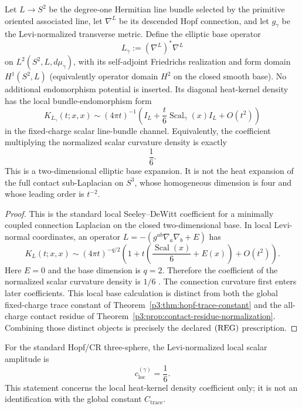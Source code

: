\documentclass[12pt,a4paper]{article}
\begin{document}
\begin{lemma}
\label{p3:lem:local-sixth-heat}
Let \(L\to S^2\) be the degree-one Hermitian line bundle selected by the
primitive oriented associated line, let \(\nabla^L\) be its descended Hopf connection,
and let \(g_\gamma\) be the Levi-normalized transverse metric.  Define the
elliptic base operator
\[
 L_\gamma:=(\nabla^L)^*\nabla^L
\]
on \(L^2(S^2,L,d\mu_\gamma)\), with its self-adjoint Friedrichs realization
and form domain \(H^1(S^2,L)\) (equivalently operator domain \(H^2\) on the
closed smooth base).  No additional endomorphism potential is inserted.  Its
diagonal heat-kernel density has the local bundle-endomorphism form
\begin{equation}
K_{L_\gamma}(t;x,x)
\sim
(4\pi t)^{-1}
\left(I_L+\frac{t}{6}\operatorname{Scal}_\gamma(x)I_L+O(t^2)\right)
\end{equation}
in the fixed-charge scalar line-bundle channel.  Equivalently, the coefficient multiplying the normalized scalar curvature density is exactly
\begin{equation}
\label{p3:eq:local-sixth-lemma}
\frac16 .
\end{equation}
This is a two-dimensional elliptic base expansion.  It is not the heat
expansion of the full contact sub-Laplacian on \(S^3\), whose homogeneous
dimension is four and whose leading order is \(t^{-2}\).
\end{lemma}
\begin{proof}
This is the standard local Seeley--DeWitt coefficient for a minimally coupled
connection Laplacian on the closed two-dimensional base.  In local
Levi-normal coordinates, an operator
\(L=-(g^{ab}\nabla_a\nabla_b+E)\) has
\[
K_L(t;x,x)\sim (4\pi t)^{-q/2}\left(1+t\left(\frac{\operatorname{Scal}(x)}{6}+E(x)\right)+O(t^2)\right).
\]
Here \(E=0\) and the base dimension is \(q=2\).  Therefore the coefficient of
the normalized scalar curvature density is \(1/6\)
\cite{berline1992heat,ChamseddineConnes1997}.  The connection curvature first
enters later coefficients.  This local base calculation is distinct from both
the global fixed-charge trace constant of
Theorem~\ref{p3:thm:hopf-trace-constant} and the all-charge contact residue of
Theorem~\ref{p3:prop:contact-residue-normalization}.  Combining those distinct
objects is precisely the declared \(({\rm REG})\) prescription.
\end{proof}

\begin{proposition}
\label{p3:prop:delta-local-sixth}
\leavevmode\par\noindent
For the standard Hopf/CR three-sphere, the Levi-normalized local scalar
amplitude is
\begin{equation}
\label{p3:eq:delta-local-sixth}
c_{\mathrm{loc}}^{(\gamma)}=\frac16.
\end{equation}
This statement concerns the local heat-kernel density coefficient only; it is
not an identification with the global constant \(C_{\mathrm{trace}}\).
\end{proposition}
\end{document}
